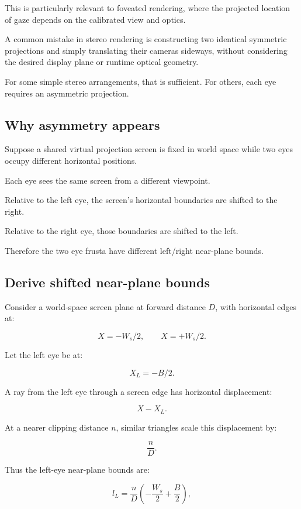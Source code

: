 This is particularly relevant to foveated rendering, where the projected location of gaze depends on the calibrated view and optics.

A common mistake in stereo rendering is constructing two identical symmetric projections and simply translating their cameras sideways, without considering the desired display plane or runtime optical geometry.

For some simple stereo arrangements, that is sufficient. For others, each eye requires an asymmetric projection.

\subsection{Why asymmetry appears}\label{02-foundations-ii-ch035-why-asymmetry-appears}

Suppose a shared virtual projection screen is fixed in world space while two eyes occupy different horizontal positions.

Each eye sees the same screen from a different viewpoint.

Relative to the left eye, the screen's horizontal boundaries are shifted to the right.

Relative to the right eye, those boundaries are shifted to the left.

Therefore the two eye frusta have different left/right near-plane bounds.

\subsection{Derive shifted near-plane bounds}\label{02-foundations-ii-ch035-derive-shifted-near-plane-bounds}

Consider a world-space screen plane at forward distance \(D\), with horizontal edges at:

\[ X=-W_s/2,\qquad X=+W_s/2. \]

Let the left eye be at:

\[ X_L=-B/2. \]

A ray from the left eye through a screen edge has horizontal displacement:

\[ X-X_L. \]

At a nearer clipping distance \(n\), similar triangles scale this displacement by:

\[ \frac nD. \]

Thus the left-eye near-plane bounds are:

\[ \boxed{ l_L=\frac nD\left(-\frac{W_s}{2}+\frac B2\right), } \]

